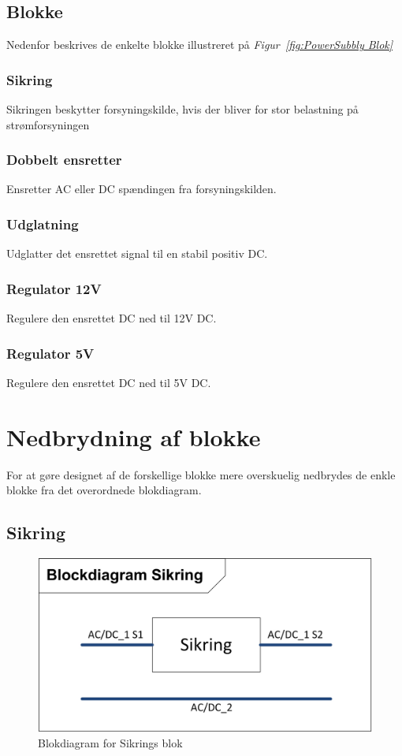 \subsection{Blokke}
Nedenfor beskrives de enkelte blokke illustreret på \textit{Figur~\ref{fig:PowerSubbly Blok}}
\subsubsection{Sikring}
Sikringen beskytter forsyningskilde, hvis der bliver for stor belastning på strømforsyningen
\subsubsection{Dobbelt ensretter}
Ensretter AC eller DC spændingen fra forsyningskilden.
\subsubsection{Udglatning}
Udglatter det ensrettet signal til en stabil positiv DC. 
\subsubsection{Regulator 12V}
Regulere den ensrettet DC ned til 12V DC.
\subsubsection{Regulator 5V}
Regulere den ensrettet DC ned til 5V DC.
\newpage
\section{Nedbrydning af blokke}
For at gøre designet af de forskellige blokke mere overskuelig nedbrydes de enkle blokke fra det overordnede blokdiagram.
\subsection{Sikring}
\begin{figure}[H]
\centering
\includegraphics[scale=1]{billeder/SikringsBlok}
\caption{Blokdiagram for Sikrings blok}
\label{fig:SikringsBlok}
\end{figure}
